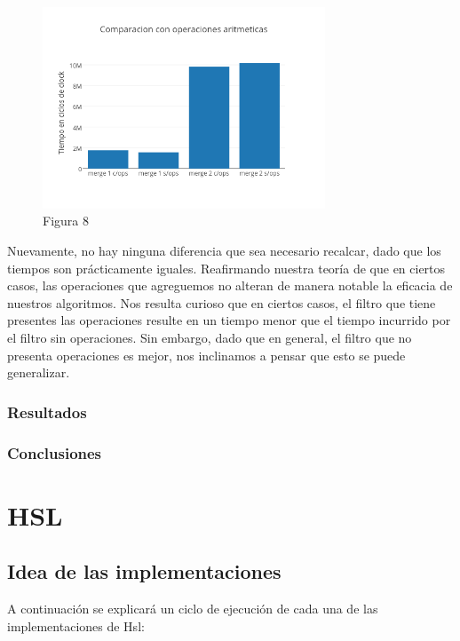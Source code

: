 \documentclass[a4paper]{article}
\begin{document}
\begin{figure}[h]
  \centering
    \includegraphics[width=0.75\textwidth]{imagenes/ComparacionConOperacionesAritmeticasMergeColores.png}
  \caption{Figura 8}
  \label{fig:graficomerge4}
\end{figure}
 \FloatBarrier

Nuevamente, no hay ninguna diferencia que sea necesario recalcar, dado que los tiempos son prácticamente iguales. Reafirmando nuestra teoría de que en ciertos casos, las operaciones que agreguemos no alteran de manera notable la eficacia de nuestros algoritmos.
Nos resulta curioso que en ciertos casos, el filtro que tiene presentes las operaciones resulte en un tiempo menor que el tiempo incurrido por el filtro sin operaciones. Sin embargo, dado que en general, el filtro que no presenta operaciones es mejor, nos inclinamos a pensar que esto se puede generalizar.


\subsubsection{Resultados}

\subsubsection{Conclusiones}


\newpage

\section{HSL}

\subsection{Idea de las implementaciones}
A continuación se explicará un ciclo de ejecución de cada una de las implementaciones de Hsl:
\end{document}
